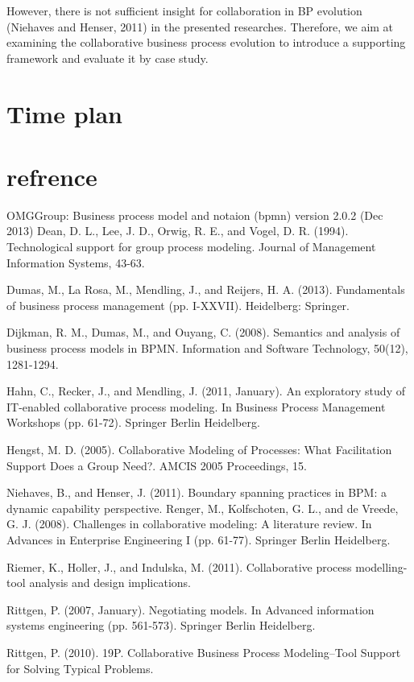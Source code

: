 \documentclass{article}
\begin{document}
However, there is not sufficient insight for collaboration in BP evolution (Niehaves and Henser, 2011) in the presented researches. Therefore, we aim at examining the collaborative business process evolution to introduce a supporting framework and evaluate it by case study.


\section{Time plan}\label{sec:tp}



\section{refrence}\label{ref}
 OMGGroup: Business process model and notaion (bpmn) version 2.0.2 (Dec 2013)
Dean, D. L., Lee, J. D., Orwig, R. E., and Vogel, D. R. (1994). Technological support for group process modeling. Journal of Management Information Systems, 43-63.


Dumas, M., La Rosa, M., Mendling, J., and Reijers, H. A. (2013). Fundamentals of business process management (pp. I-XXVII). Heidelberg: Springer.


Dijkman, R. M., Dumas, M., and Ouyang, C. (2008). Semantics and analysis of business process models in BPMN. Information and Software Technology, 50(12), 1281-1294.


Hahn, C., Recker, J., and Mendling, J. (2011, January). An exploratory study of IT-enabled collaborative process modeling. In Business Process Management Workshops (pp. 61-72). Springer Berlin Heidelberg.


Hengst, M. D. (2005). Collaborative Modeling of Processes: What Facilitation Support Does a Group Need?. AMCIS 2005 Proceedings, 15.


Niehaves, B., and Henser, J. (2011). Boundary spanning practices in BPM: a dynamic capability perspective.
Renger, M., Kolfschoten, G. L., and de Vreede, G. J. (2008). Challenges in collaborative modeling: A literature review. In Advances in Enterprise Engineering I (pp. 61-77). Springer Berlin Heidelberg.

Riemer, K., Holler, J., and Indulska, M. (2011). Collaborative process modelling-tool analysis and design implications.


Rittgen, P. (2007, January). Negotiating models. In Advanced information systems engineering (pp. 561-573). Springer Berlin Heidelberg.


Rittgen, P. (2010). 19P. Collaborative Business Process Modeling–Tool Support for Solving Typical Problems.
\end{document}
